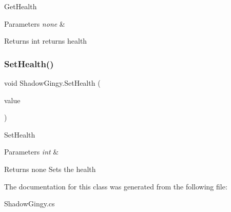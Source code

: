 Get\+Health 
\begin{DoxyParams}{Parameters}
{\em none} & \\
\hline
\end{DoxyParams}
\begin{DoxyReturn}{Returns}
int returns health 
\end{DoxyReturn}
\mbox{\label{class_shadow_gingy_a748db29527d960eb1de77379f4586234}} 
\subsubsection{\texorpdfstring{Set\+Health()}{SetHealth()}}
{\footnotesize\ttfamily void Shadow\+Gingy.\+Set\+Health (\begin{DoxyParamCaption}\item[{int}]{value }\end{DoxyParamCaption})\hspace{0.3cm}{\ttfamily [inline]}}

Set\+Health 
\begin{DoxyParams}{Parameters}
{\em int} & \\
\hline
\end{DoxyParams}
\begin{DoxyReturn}{Returns}
none Sets the health 
\end{DoxyReturn}


The documentation for this class was generated from the following file\+:\begin{DoxyCompactItemize}
\item 
Shadow\+Gingy.\+cs\end{DoxyCompactItemize}
